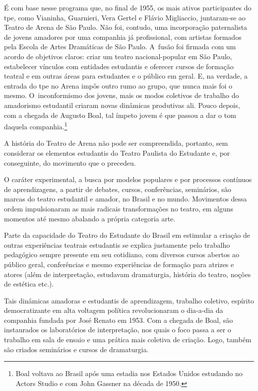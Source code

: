 É com base nesse programa que, no final de 1955, os mais ativos
participantes do {\sc tpe}, como Vianinha, Guarnieri, Vera Gertel e Flávio
Migliaccio, juntaram-se ao Teatro de Arena de São Paulo. Não foi,
contudo, uma incorporação paternalista de jovens amadores por uma
companhia já profissional, com artistas formados pela Escola de Artes
Dramáticas de São Paulo. A~fusão foi firmada com um acordo de objetivos
claros: criar um teatro nacional-popular em São Paulo, estabelecer
vínculos com entidades estudantis e oferecer cursos de formação teatral
e em outras áreas para estudantes e o público em geral. E, na verdade, a
entrada do {\sc tpe} no Arena impôs outro rumo ao grupo, que nunca mais foi o
mesmo. O~inconformismo dos jovens, mais os modos coletivos de trabalho
do amadorismo estudantil criaram novas dinâmicas produtivas ali. Pouco
depois, com a chegada de Augusto Boal, tal ímpeto jovem é que passou a
dar o tom daquela companhia.\footnote{Boal voltava ao Brasil após uma
  estadia nos Estados Unidos estudando no Actors Studio e com John
  Gassner na década de 1950.}

\subject{Efervescência política e cultural dos anos 1960}

A história do Teatro de Arena não pode ser compreendida, portanto, sem
considerar os elementos estudantis do Teatro Paulista do Estudante e,
por conseguinte, do movimento que o precedeu.

O caráter experimental, a busca por modelos populares e por processos
contínuos de aprendizagens, a partir de debates, cursos, conferências,
seminários, são marcas do teatro estudantil e amador, no Brasil e no
mundo. Movimentos dessa ordem impulsionaram as mais radicais
transformações no teatro, em alguns momentos até mesmo abalando a
própria categoria arte.

Parte da capacidade do Teatro do Estudante do Brasil em estimular a
criação de outras experiências teatrais estudantis se explica justamente
pelo trabalho pedagógico sempre presente em seu cotidiano, com diversos
cursos abertos ao público geral, conferências e mesmo experiências de
formação para atrizes e atores (além de interpretação, estudavam
dramaturgia, história do teatro, noções de estética etc.).

Tais dinâmicas amadoras e estudantis de aprendizagem, trabalho coletivo,
espírito democratizante em alta voltagem política revolucionaram o
dia-a-dia da companhia fundada por José Renato em 1953. Com a chegada de
Boal, são instaurados os laboratórios de interpretação, nos quais o foco
passa a ser o trabalho em sala de ensaio e uma prática mais coletiva de
criação. Logo, também são criados seminários e cursos de dramaturgia.

